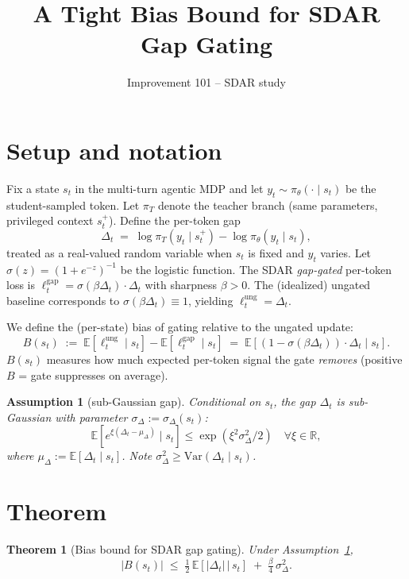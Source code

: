 \documentclass[11pt]{article}
\title{A Tight Bias Bound for SDAR Gap Gating}
\author{Improvement 101 -- SDAR study}
\date{}
\newtheorem{theorem}{Theorem}
\newtheorem{assumption}{Assumption}
\begin{document}
\maketitle

\section*{Setup and notation}

Fix a state $s_t$ in the multi-turn agentic MDP and let $y_t \sim \pi_\theta(\cdot \mid s_t)$ be the student-sampled token. Let $\pi_T$ denote the teacher branch (same parameters, privileged context $s_t^+$). Define the per-token gap
\[
\Delta_t \;=\; \log \pi_T(y_t \mid s_t^+) - \log \pi_\theta(y_t \mid s_t),
\]
treated as a real-valued random variable when $s_t$ is fixed and $y_t$ varies. Let $\sigma(z) = (1+e^{-z})^{-1}$ be the logistic function. The SDAR \emph{gap-gated} per-token loss is $\ell^{\mathrm{gap}}_t = \sigma(\beta \Delta_t) \cdot \Delta_t$ with sharpness $\beta > 0$. The (idealized) ungated baseline corresponds to $\sigma(\beta \Delta_t) \equiv 1$, yielding $\ell^{\mathrm{ung}}_t = \Delta_t$.

We define the (per-state) bias of gating relative to the ungated update:
\[
B(s_t) \;:=\; \mathbb{E}\!\left[ \ell^{\mathrm{ung}}_t \mid s_t \right] - \mathbb{E}\!\left[ \ell^{\mathrm{gap}}_t \mid s_t \right]
\;=\; \mathbb{E}\!\left[ (1 - \sigma(\beta \Delta_t)) \cdot \Delta_t \mid s_t \right].
\]
$B(s_t)$ measures how much expected per-token signal the gate \emph{removes} (positive $B$ = gate suppresses on average).

\begin{assumption}[sub-Gaussian gap]\label{assump:subgauss}
Conditional on $s_t$, the gap $\Delta_t$ is sub-Gaussian with parameter $\sigma_\Delta := \sigma_\Delta(s_t)$:
\[
\mathbb{E}[e^{\xi(\Delta_t - \mu_\Delta)} \mid s_t] \leq \exp\!\left(\xi^2 \sigma_\Delta^2 / 2\right) \quad \forall \xi \in \mathbb{R},
\]
where $\mu_\Delta := \mathbb{E}[\Delta_t \mid s_t]$. Note $\sigma_\Delta^2 \geq \mathrm{Var}(\Delta_t \mid s_t)$.
\end{assumption}

\section*{Theorem}

\begin{theorem}[Bias bound for SDAR gap gating]\label{thm:bias}
Under Assumption~\ref{assump:subgauss},
\[
|B(s_t)| \;\leq\; \tfrac{1}{2}\, \mathbb{E}\!\left[|\Delta_t| \,\big|\, s_t\right] \;+\; \tfrac{\beta}{4}\, \sigma_\Delta^2.
\]
\end{theorem}
\end{document}
